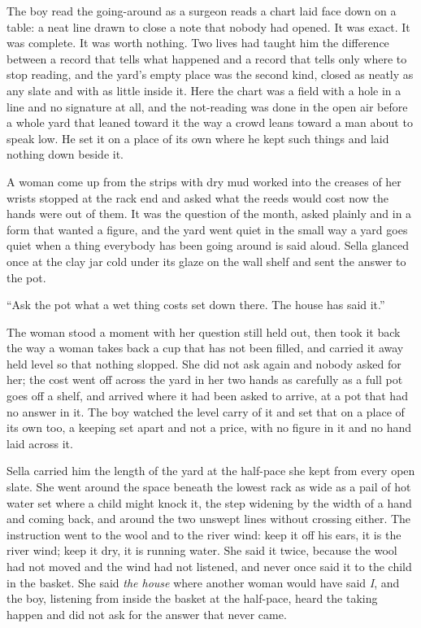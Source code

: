 The boy read the going-around as a surgeon reads a chart laid face down on a table: a neat line drawn to close a note that nobody had opened. It was exact. It was complete. It was worth nothing. Two lives had taught him the difference between a record that tells what happened and a record that tells only where to stop reading, and the yard's empty place was the second kind, closed as neatly as any slate and with as little inside it. Here the chart was a field with a hole in a line and no signature at all, and the not-reading was done in the open air before a whole yard that leaned toward it the way a crowd leans toward a man about to speak low. He set it on a place of its own where he kept such things and laid nothing down beside it.

A woman come up from the strips with dry mud worked into the creases of her wrists stopped at the rack end and asked what the reeds would cost now the hands were out of them. It was the question of the month, asked plainly and in a form that wanted a figure, and the yard went quiet in the small way a yard goes quiet when a thing everybody has been going around is said aloud. Sella glanced once at the clay jar cold under its glaze on the wall shelf and sent the answer to the pot.

“Ask the pot what a wet thing costs set down there. The house has said it.”

The woman stood a moment with her question still held out, then took it back the way a woman takes back a cup that has not been filled, and carried it away held level so that nothing slopped. She did not ask again and nobody asked for her; the cost went off across the yard in her two hands as carefully as a full pot goes off a shelf, and arrived where it had been asked to arrive, at a pot that had no answer in it. The boy watched the level carry of it and set that on a place of its own too, a keeping set apart and not a price, with no figure in it and no hand laid across it.

\scenebreak

Sella carried him the length of the yard at the half-pace she kept from every open slate. She went around the space beneath the lowest rack as wide as a pail of hot water set where a child might knock it, the step widening by the width of a hand and coming back, and around the two unswept lines without crossing either. The instruction went to the wool and to the river wind: keep it off his ears, it is the river wind; keep it dry, it is running water. She said it twice, because the wool had not moved and the wind had not listened, and never once said it to the child in the basket. She said \emph{the house} where another woman would have said \emph{I}, and the boy, listening from inside the basket at the half-pace, heard the taking happen and did not ask for the answer that never came.

